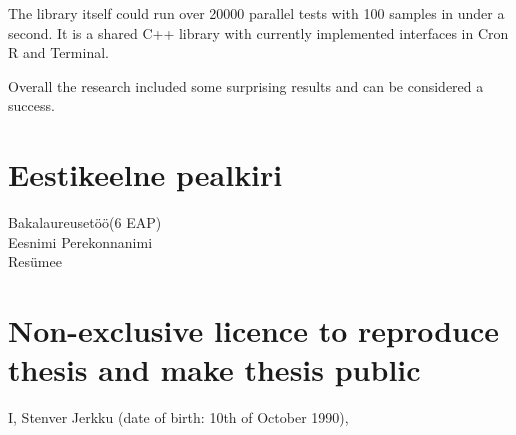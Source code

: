 \documentclass[12pt]{article}
\begin{document}
The library itself could run over 20000 parallel tests with 100 samples in under a second. It is a shared C++ library with currently implemented interfaces in Cron R and Terminal.

Overall the research included some surprising results and can be considered a success.

\newpage


\section{Eestikeelne pealkiri}
Bakalaureusetöö(6 EAP) \\
Eesnimi Perekonnanimi \\
Resümee \\



\newpage




\appendix
\pagebreak

\section*{\small Non-exclusive licence to reproduce thesis and make thesis public}

I, Stenver Jerkku (date of birth: 10th of October 1990),
\end{document}

